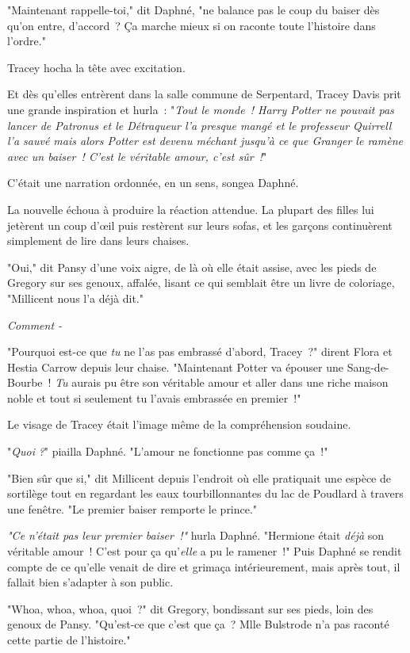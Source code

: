 "Maintenant rappelle-toi," dit Daphné, "ne balance pas le coup du baiser dès qu'on entre, d'accord~? Ça marche mieux si on raconte toute l'histoire dans l'ordre."

Tracey hocha la tête avec excitation.

Et dès qu'elles entrèrent dans la salle commune de Serpentard, Tracey Davis prit une grande inspiration et hurla~: "\emph{Tout le monde~! Harry Potter ne pouvait pas lancer de Patronus et le Détraqueur l'a presque mangé et le professeur Quirrell l'a sauvé mais alors Potter est devenu méchant jusqu'à ce que Granger le ramène avec un baiser~! C'est le véritable amour, c'est sûr~!}"

C'était une narration ordonnée, en un sens, songea Daphné.

La nouvelle échoua à produire la réaction attendue. La plupart des filles lui jetèrent un coup d'œil puis restèrent sur leurs sofas, et les garçons continuèrent simplement de lire dans leurs chaises.

"Oui," dit Pansy d'une voix aigre, de là où elle était assise, avec les pieds de Gregory sur ses genoux, affalée, lisant ce qui semblait être un livre de coloriage, "Millicent nous l'a déjà dit."

\emph{Comment -}

"Pourquoi est-ce que \emph{tu} ne l'as pas embrassé d'abord, Tracey~?" dirent Flora et Hestia Carrow depuis leur chaise. "Maintenant Potter va épouser une Sang-de-Bourbe~! \emph{Tu} aurais pu être son véritable amour et aller dans une riche maison noble et tout si seulement tu l'avais embrassée en premier~!"

Le visage de Tracey était l'image même de la compréhension soudaine.

"\emph{Quoi} \emph{?}" piailla Daphné. "L'amour ne fonctionne pas comme ça~!"

"Bien sûr que si," dit Millicent depuis l'endroit où elle pratiquait une espèce de sortilège tout en regardant les eaux tourbillonnantes du lac de Poudlard à travers une fenêtre. "Le premier baiser remporte le prince."

\emph{"Ce n'était pas leur premier baiser~!"} hurla Daphné. "Hermione était \emph{déjà} son véritable amour~! C'est pour ça qu'\emph{elle} a pu le ramener~!" Puis Daphné se rendit compte de ce qu'elle venait de dire et grimaça intérieurement, mais après tout, il fallait bien s'adapter à son public.

"Whoa, whoa, whoa, quoi~?" dit Gregory, bondissant sur ses pieds, loin des genoux de Pansy. "Qu'est-ce que c'est que ça~? Mlle Bulstrode n'a pas raconté cette partie de l'histoire."

